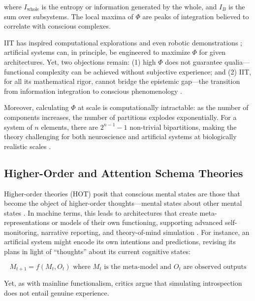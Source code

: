 where $I_{\text{whole}}$ is the entropy or information generated by the whole, and $I_{B}$ is the sum over subsystems. The local maxima of $\Phi$ are peaks of integration believed to correlate with conscious complexes.

IIT has inspired computational explorations and even robotic demonstrations \cite{albantakis2023integrated}; artificial systems can, in principle, be engineered to maximize $\Phi$ for given architectures. Yet, two objections remain: (1) high $\Phi$ does not guarantee qualia---functional complexity can be achieved without subjective experience; and (2) IIT, for all its mathematical rigor, cannot bridge the epistemic gap---the transition from information integration to conscious phenomenology \cite{garridomerchan2024machine,levine1983materialism}.

Moreover, calculating $\Phi$ at scale is computationally intractable: as the number of components increases, the number of partitions explodes exponentially. For a system of $n$ elements, there are $2^{n-1} - 1$ non-trivial bipartitions, making the theory challenging for both neuroscience and artificial systems at biologically realistic scales \cite{barrett2019phi}.

\subsection{Higher-Order and Attention Schema Theories}
\label{subsec:hot_ast}

Higher-order theories (HOT) posit that conscious mental states are those that become the object of higher-order thoughts---mental states about other mental states \cite{brown2019higher,rosenthal2009concepts}. In machine terms, this leads to architectures that create meta-representations or models of their own functioning, supporting advanced self-monitoring, narrative reporting, and theory-of-mind simulation \cite{qin2025taxonomy}. For instance, an artificial system might encode its own intentions and predictions, revising its plans in light of ``thoughts'' about its current cognitive states:

\vspace{-2.0\baselineskip}
\begin{equation}
M_{t+1} = f(M_t, O_t) \text{ where } M_t \text{ is the meta-model and } O_t \text{ are observed outputs}
\label{eq:meta_model}
\end{equation}
\vspace{-2.0\baselineskip}

Yet, as with mainline functionalism, critics argue that simulating introspection does not entail genuine experience.

